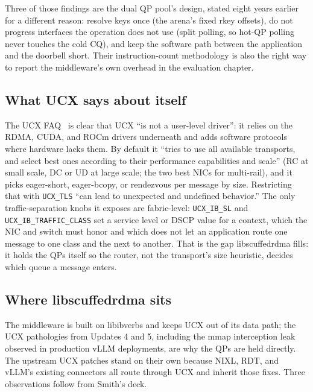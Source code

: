 \documentclass[11pt,letterpaper]{article}
\begin{document}
Three of those findings are the dual QP pool's design, stated eight years earlier for a different reason: resolve keys once (the arena's fixed rkey offsets), do not progress interfaces the operation does not use (split polling, so hot-QP polling never touches the cold CQ), and keep the software path between the application and the doorbell short. Their instruction-count methodology is also the right way to report the middleware's own overhead in the evaluation chapter.

\subsection{What UCX says about itself}

The UCX FAQ~\cite{ucx_faq} is clear that UCX ``is not a user-level driver'': it relies on the RDMA, CUDA, and ROCm drivers underneath and adds software protocols where hardware lacks them. By default it ``tries to use all available transports, and select best ones according to their performance capabilities and scale'' (RC at small scale, DC or UD at large scale; the two best NICs for multi-rail), and it picks eager-short, eager-bcopy, or rendezvous per message by size. Restricting that with \texttt{UCX\_TLS} ``can lead to unexpected and undefined behavior.'' The only traffic-separation knobs it exposes are fabric-level: \texttt{UCX\_IB\_SL} and \texttt{UCX\_IB\_TRAFFIC\_CLASS} set a service level or DSCP value for a context, which the NIC and switch must honor and which does not let an application route one message to one class and the next to another. That is the gap libscuffedrdma fills: it holds the QPs itself so the router, not the transport's size heuristic, decides which queue a message enters.

\subsection{Where libscuffedrdma sits}

The middleware is built on libibverbs and keeps UCX out of its data path; the UCX pathologies from Updates 4 and 5, including the mmap interception leak observed in production vLLM deployments, are why the QPs are held directly. The upstream UCX patches stand on their own because NIXL, RDT, and vLLM's existing connectors all route through UCX and inherit those fixes. Three observations follow from Smith's deck.
\end{document}
